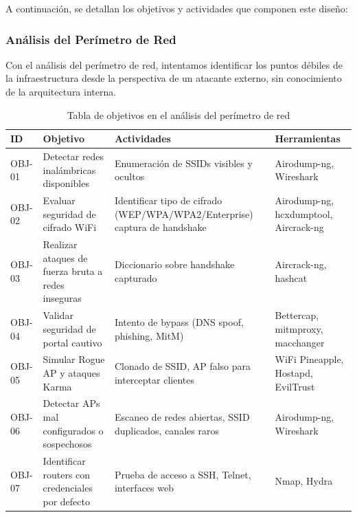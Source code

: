 \documentclass[a4paper, 11pt]{article}
\begin{document}
\par\vspace{0.5cm}




A continuación, se detallan los objetivos y actividades que componen este diseño:

\par\vspace{0.5cm}


\subsubsection{Análisis del Perímetro de Red}

Con el análisis del perímetro de red, intentamos identificar los puntos débiles de la infraestructura desde la perspectiva de un atacante externo, sin conocimiento de la arquitectura interna.

\begin{table}[H]
    \centering
    \renewcommand{\arraystretch}{1.4}
    \begin{tabular}{|p{1.4cm}|p{3.9cm}|p{5.3cm}|p{4.2cm}|}
    \hline
    \textbf{ID} & \textbf{Objetivo} & \textbf{Actividades} & \textbf{Herramientas}\\
    \hline
    OBJ-01 & Detectar redes inalámbricas disponibles & Enumeración de SSIDs visibles y ocultos & Airodump-ng, Wireshark\\
    \hline
    OBJ-02 & Evaluar seguridad de cifrado WiFi & Identificar tipo de cifrado (WEP/WPA/WPA2/Enterprise) captura de handshake & Airodump-ng, hcxdumptool, Aircrack-ng \\
    \hline
    OBJ-03 & Realizar ataques de fuerza bruta a redes inseguras & Diccionario sobre handshake capturado & Aircrack-ng, hashcat \\
    \hline
    OBJ-04 & Validar seguridad de portal cautivo & Intento de bypass (DNS spoof, phishing, MitM) & Bettercap, mitmproxy, macchanger\\
    \hline
    OBJ-05 & Simular Rogue AP y ataques Karma & Clonado de SSID, AP falso para interceptar clientes & WiFi Pineapple, Hostapd, EvilTrust \\
    \hline
    OBJ-06 & Detectar APs mal configurados o sospechosos & Escaneo de redes abiertas, SSID duplicados, canales raros & Airodump-ng, Wireshark\\
    \hline
    OBJ-07 & Identificar routers con credenciales por defecto & Prueba de acceso a SSH, Telnet, interfaces web & Nmap, Hydra \\
    \hline
    \end{tabular}
    \caption{Tabla de objetivos en el análisis del perímetro de red}
    \end{table}
    
\end{document}
